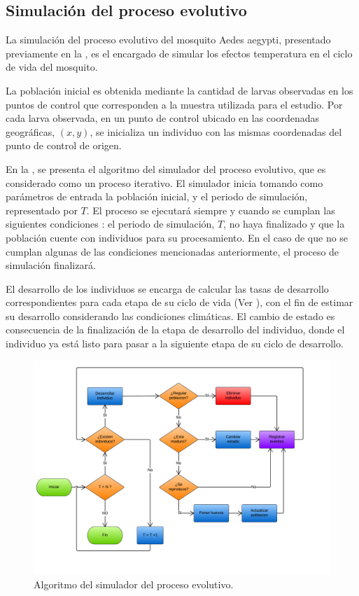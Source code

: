\subsection{Simulación del proceso evolutivo}
La simulación del proceso evolutivo del mosquito Aedes aegypti, presentado previamente en la
, es el encargado de simular los efectos temperatura
en el ciclo de vida del mosquito.

La población inicial es obtenida mediante la cantidad de larvas observadas en los puntos de
control que corresponden a la muestra utilizada para el estudio. Por cada larva observada,
en un punto de control ubicado en las coordenadas geográficas, $(x, y)$, se inicializa un individuo
con las mismas coordenadas del punto de control de origen.

En la , se presenta el algoritmo del simulador del proceso
evolutivo, que es considerado como un proceso iterativo. El simulador inicia tomando como
parámetros de entrada la población inicial, y el periodo de simulación, representado por $T$. El
proceso se ejecutará siempre y cuando se cumplan las siguientes condiciones : el periodo de
simulación, $T$, no haya finalizado y que la población cuente con individuos para su procesamiento.
En el caso de que no se cumplan algunas de las condiciones mencionadas anteriormente, el proceso
de simulación finalizará.

El desarrollo de los individuos se encarga de calcular las tasas de desarrollo correspondientes
para cada etapa de su ciclo de vida (Ver 
), con el fin de estimar su desarrollo considerando las condiciones climáticas. El cambio de
estado es consecuencia de la finalización de la etapa de desarrollo del individuo, donde el
individuo ya está listo para pasar a la siguiente etapa de su ciclo de desarrollo.

\begin{figure}
\centering
\includegraphics[width=1\textwidth]{capitulo-5/graphics/algoritmo-evolutivo.png}
\caption{\label{fig:cap-5-alg-evolutivo} Algoritmo del simulador del proceso evolutivo.}
\end{figure}

